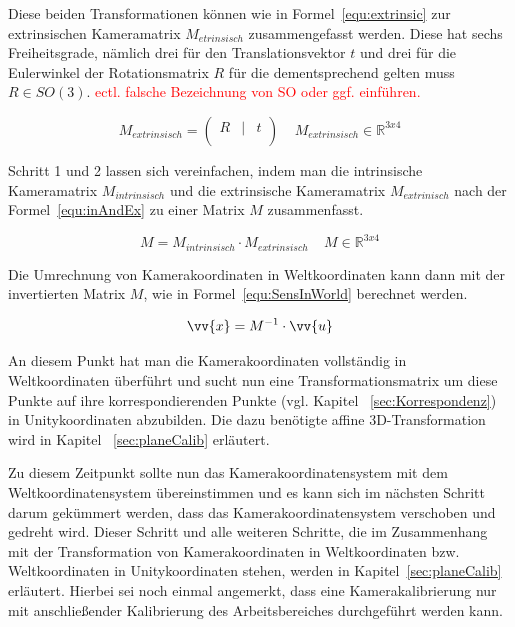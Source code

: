 \begin{description}
Diese beiden Transformationen können wie in Formel~\ref{equ:extrinsic} zur extrinsischen Kameramatrix $M_{etrinsisch}$ zusammengefasst werden. Diese hat sechs Freiheitsgrade, nämlich drei für den Translationsvektor $t$ und drei für die Eulerwinkel der Rotationsmatrix $R$ für die dementsprechend gelten muss $R \in SO(3)$. \textcolor{red}{ectl. falsche Bezeichnung von SO oder ggf. einführen.}

\begin{equation}
\label{equ:extrinsic}
M_{extrinsisch}= 
\begin{pmatrix}
R &|& t \\
\end{pmatrix} 
~ ~ ~ ~ ~M_{extrinsisch} \in \mathbb{R}^{3x4}
\end{equation}

Schritt 1 und 2 lassen sich vereinfachen, indem man die intrinsische Kameramatrix $M_{intrinsisch}$ und die extrinsische Kameramatrix $M_{extrinisch}$ nach der Formel~\ref{equ:inAndEx} zu einer Matrix $M$ zusammenfasst.

\begin{equation}
\label{equ:inAndEx}
M = M_{intrinsisch} \cdot M_{extrinsisch}~ ~ ~ ~ ~M\in \mathbb{R}^{3x4}
\end{equation}

Die Umrechnung von Kamerakoordinaten in Weltkoordinaten kann dann mit der invertierten Matrix $M$, wie in Formel~\ref{equ:SensInWorld} berechnet werden. \

\begin{equation}
\label{equ:SensInWorld}
\vv{x} = M^{-1} \cdot \vv{u}
\end{equation}

An diesem Punkt hat man die Kamerakoordinaten vollständig in Weltkoordinaten überführt und sucht nun eine Transformationsmatrix um diese Punkte auf ihre korrespondierenden Punkte (vgl. Kapitel ~\ref{sec:Korrespondenz}) in Unitykoordinaten abzubilden. Die dazu benötigte affine 3D-Transformation wird in Kapitel ~\ref{sec:planeCalib} erläutert.
\end{description}

Zu diesem Zeitpunkt sollte nun das Kamerakoordinatensystem mit dem Weltkoordinatensystem übereinstimmen und es kann sich im nächsten Schritt darum gekümmert werden, dass das Kamerakoordinatensystem verschoben und gedreht wird. Dieser Schritt und alle weiteren Schritte, die im Zusammenhang mit der Transformation von Kamerakoordinaten in Weltkoordinaten bzw. Weltkoordinaten in Unitykoordinaten stehen, werden in Kapitel~\ref{sec:planeCalib} erläutert. Hierbei sei noch einmal angemerkt, dass eine Kamerakalibrierung nur mit anschließender Kalibrierung des Arbeitsbereiches durchgeführt werden kann.


